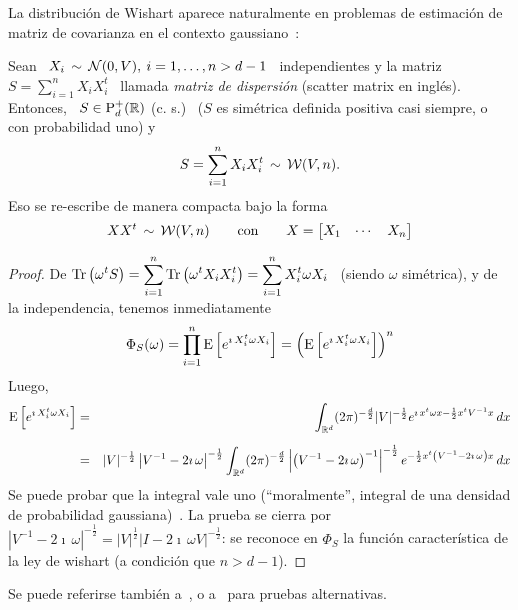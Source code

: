 La distribuci\'on  de Wishart aparece naturalmente en  problemas de estimaci\'on
de matriz de covarianza en el contexto gaussiano~\cite{Mui82, BilBre99, GupNag99,
  And03, Seb04, KotNad04}:
%
\begin{lema}\label{Lem:MP:WishartGaussiana}
%
  Sean \ $X_i \, \sim \, \mathcal{N}(0,V), \: i = 1, \ldots , n > d-1$ \ independientes y
  la  matriz  \  $S  =  \sum_{i=1}^n   X_i  X_i^t$  \  llamada  {\em  matriz  de
    dispersi\'on} (scatter matrix en ingl\'es). Entonces, \ $S \in \mathrm{P}_d^+(\mathbb{R})$
  (c.   s.)   \  ($S$ es  sim\'etrica  definida  positiva  casi siempre,  o  con
  probabilidad uno) y \
  \[
  S = \sum_{i=1}^n X_i X_i^t \,\sim \, \mathcal{W}(V,n).
  \]
  Eso se re-escribe de manera compacta bajo la forma
  \[
  X X^t  \,\sim \, \mathcal{W}(V,n)  \qquad \mbox{con} \qquad  X = \begin{bmatrix}  X_1 &
    \cdots & X_n \end{bmatrix}
  \]
\end{lema}
%
\begin{proof}
  De  $\displaystyle  \operatorname{Tr}\left(  \omega^t  S \right)  =  \sum_{i=1}^n  \operatorname{Tr}\left(
    \omega^t  X_i X_i^t  \right)  =  \sum_{i=1}^n X_i^t  \omega  X_i$ \  (siendo
  $\omega$ sim\'etrica), y de la independencia, tenemos inmediatamente
  \[
  \Phi_S(\omega)  =  \prod_{i=1}^n \operatorname{E}\left[  e^{\imath  \,  X_i^t \omega  X_i}
  \right] = \left( \operatorname{E}\left[ e^{\imath \, X_i^t \omega X_i} \right] \right)^n
  \]
  Luego,
  \begin{eqnarray*}
  \operatorname{E}\left[ e^{\imath \, X_i^t \omega X_i} \right] & = & \int_{\mathbb{R}^d} (2
  \pi)^{-\frac{d}{2}} |V|^{-\frac12} e^{\imath \, x^t \omega x - \frac12 x^t
  V^{-1} x} \, dx\\[2mm]
  & = & |V|^{-\frac12} \left| V^{-1} - 2 \imath \, \omega \right|^{-\frac12}
  \int_{\mathbb{R}^d} (2 \pi)^{-\frac{d}{2}} \left| \left(V^{-1} - 2 \imath \,
  \omega\right)^{-1} \right|^{-\frac12} e^{- \frac12 x^t \left(V^{-1} - 2 \imath
  \, \omega \right) x} \, dx
  \end{eqnarray*}
  Se  puede probar que  la integral  vale uno  (``moralmente'', integral  de una
  densidad de  probabilidad gaussiana)~\cite[Teo.~2.1.11]{Mui82}.  La  prueba se
  cierra  por  $\left|  V^{-1}  -   2  \imath  \,  \omega  \right|^{-\frac12}  =
  |V|^{\frac12} \left| I - 2 \imath \, \omega V \right|^{-\frac12}$: se reconoce
  en $\Phi_S$ la funci\'on caracter\'istica  de la ley de wishart (a condici\'on
  que $n > d-1$).
\end{proof}
%
\noindent  Se  puede  referirse  tambi\'en a~\cite{GupNag99,  And03,  Seb04},  o
a~\cite[Ej.~7.2]{BilBre99} para pruebas alternativas.

